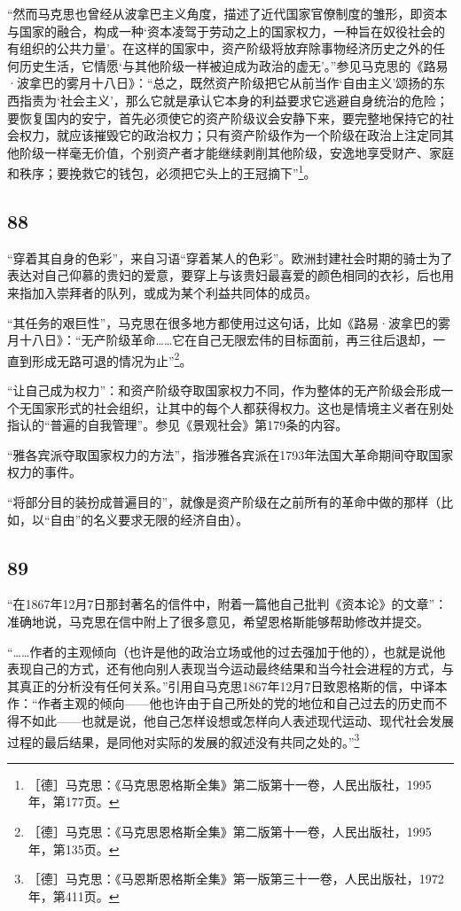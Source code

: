 \documentclass[fontset=fandol, a4paper, 12pt, openright]{ctexbook}
\begin{document}
“然而马克思也曾经从波拿巴主义角度，描述了近代国家官僚制度的雏形，即资本与国家的融合，构成一种‘资本凌驾于劳动之上的国家权力，一种旨在奴役社会的有组织的公共力量’。在这样的国家中，资产阶级将放弃除事物经济历史之外的任何历史生活，它情愿‘与其他阶级一样被迫成为政治的虚无’。”参见马克思的《路易·波拿巴的雾月十八日》：“总之，既然资产阶级把它从前当作‘自由主义’颂扬的东西指责为‘社会主义’，那么它就是承认它本身的利益要求它逃避自身统治的危险；要恢复国内的安宁，首先必须使它的资产阶级议会安静下来，要完整地保持它的社会权力，就应该摧毁它的政治权力；只有资产阶级作为一个阶级在政治上注定同其他阶级一样毫无价值，个别资产者才能继续剥削其他阶级，安逸地享受财产、家庭和秩序；要挽救它的钱包，必须把它头上的王冠摘下”\footnote{［德］马克思：《马克思恩格斯全集》第二版第十一卷，人民出版社，1995年，第177页。}。

\subsection*{88}
“穿着其自身的色彩”，来自习语“穿着某人的色彩”。欧洲封建社会时期的骑士为了表达对自己仰慕的贵妇的爱意，要穿上与该贵妇最喜爱的颜色相同的衣衫，后也用来指加入崇拜者的队列，或成为某个利益共同体的成员。

“其任务的艰巨性”，马克思在很多地方都使用过这句话，比如《路易·波拿巴的雾月十八日》：“无产阶级革命……它在自己无限宏伟的目标面前，再三往后退却，一直到形成无路可退的情况为止”\footnote{［德］马克思：《马克思恩格斯全集》第二版第十一卷，人民出版社，1995年，第135页。}。

“让自己成为权力”：和资产阶级夺取国家权力不同，作为整体的无产阶级会形成一个无国家形式的社会组织，让其中的每个人都获得权力。这也是情境主义者在别处指认的“普遍的自我管理”。参见《景观社会》第179条的内容。

“雅各宾派夺取国家权力的方法”，指涉雅各宾派在1793年法国大革命期间夺取国家权力的事件。

“将部分目的装扮成普遍目的”，就像是资产阶级在之前所有的革命中做的那样（比如，以“自由”的名义要求无限的经济自由）。

\subsection*{89}
“在1867年12月7日那封著名的信件中，附着一篇他自己批判《资本论》的文章”：准确地说，马克思在信中附上了很多意见，希望恩格斯能够帮助修改并提交。

“……作者的主观倾向（也许是他的政治立场或他的过去强加于他的），也就是说他表现自己的方式，还有他向别人表现当今运动最终结果和当今社会进程的方式，与其真正的分析没有任何关系。”引用自马克思1867年12月7日致恩格斯的信，中译本作：“作者主观的倾向——他也许由于自己所处的党的地位和自己过去的历史而不得不如此——也就是说，他自己怎样设想或怎样向人表述现代运动、现代社会发展过程的最后结果，是同他对实际的发展的叙述没有共同之处的。”\footnote{［德］马克思：《马恩斯恩格斯全集》第一版第三十一卷，人民出版社，1972年，第411页。}
\end{document}
